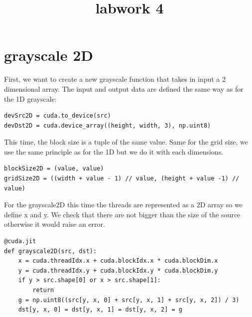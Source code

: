 \documentclass{report}
\begin{document}
\title{labwork 4}
\maketitle

\section{grayscale 2D}
First, we want to create a new grayscale function that takes in input a 2 dimensional array. The input and output data are defined the same way as for the 1D grayscale:
\begin{lstlisting}
devSrc2D = cuda.to_device(src)
devDst2D = cuda.device_array((height, width, 3), np.uint8)
\end{lstlisting}
This time, the block size is a tuple of the same value. Same for the grid size, we use the same principle as for the 1D but we do it with each dimensions.
\begin{lstlisting}
blockSize2D = (value, value)
gridSize2D = ((width + value - 1) // value, (height + value -1) // value)
\end{lstlisting}
For the grayscale2D this time the threads are represented as a 2D array so we define x and y. We check that there are not bigger than the size of the source otherwise it would raise an error.
\begin{lstlisting}
@cuda.jit
def grayscale2D(src, dst):
    x = cuda.threadIdx.x + cuda.blockIdx.x * cuda.blockDim.x
    y = cuda.threadIdx.y + cuda.blockIdx.y * cuda.blockDim.y
    if y > src.shape[0] or x > src.shape[1]:
        return
    g = np.uint8((src[y, x, 0] + src[y, x, 1] + src[y, x, 2]) / 3)
    dst[y, x, 0] = dst[y, x, 1] = dst[y, x, 2] = g
\end{lstlisting}
\newpage
\end{document}
